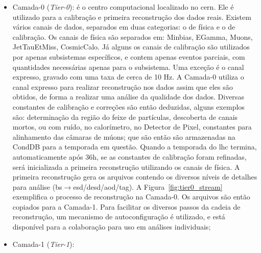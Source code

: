 \begin{itemize}
\item Camada-0 (\emph{Tier-0}): %
é o centro computacional localizado no \gls{cern}. Ele é utilizado para a
calibração e primeira reconstrução dos dados reais. Existem vários canais de dados, 
separados em duas categorias: o de física e o de calibração. Os canais de física são separados em:
Minbias, EGamma, Muons, JetTauEtMiss, CosmicCalo. Já alguns os canais de calibração são
utilizados por apenas subsistemas específicos, e contem apenas eventos parciais,
com quantidades necessárias apenas para o subsistema. Uma exceção é o canal 
expresso, gravado com uma taxa de cerca de 10 Hz. A Camada-0 utiliza o canal
expresso para realizar reconstrução nos dados assim que eles são obtidos, de
forma a realizar uma análise da qualidade dos dados.
Diversas constantes de calibração e correções são então deduzidas, 
alguns exemplos são: determinação da região do 
feixe de partículas, descoberta de canais mortos, ou com ruído,
no calorímetro, no Detector de Pixel, constantes para alinhamento das câmaras de
múons; que são então são armazenadas na CondDB para a temporada em questão. 
Quando a temporada do \gls{lhc} termina, automaticamente após 36h, se as
constantes de calibração foram refinadas, será inicializada a primeira 
reconstrução utilizando os canais de física. 
A primeira reconstrução gera os arquivos contendo os diversos níveis de 
detalhes para análise
(\gls{bs}$\rightarrow$\gls{esd}/\gls{desd}/\gls{aod}/\gls{tag}). A
Figura~\ref{fig:tier0_stream} exemplifica o processo de reconstrução na
Camada-0. Os arquivos são então copiados para a Camada-1.
Para facilitar os diversos passos da cadeia de reconstrução, 
um mecanismo de autoconfiguração \cite{recotrf} é utilizado, 
e está disponível para a colaboração para uso em análises individuais;
\item Camada-1 (\emph{Tier-1}): %

\end{itemize}
